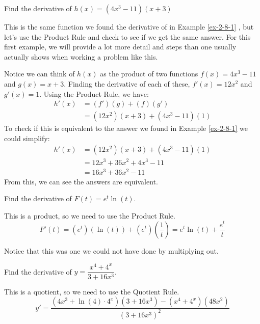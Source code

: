 \begin{example}
Find the derivative of $h(x)=(4x^3-11)(x+3)$

\begin{solution} This is the same function we found the derivative of in Example \ref{ex-2-8-1} , but let's use the Product Rule and check to see if we get the same answer. For this first example, we will provide a lot more detail and steps than one usually actually shows when working a problem like this.

Notice we can think of $h(x)$ as the product of two functions $f(x)=4x^3-11$ and $g(x)=x+3$. Finding the derivative of each of these,
$f'(x)=12x^2$ and $g'(x)=1$.
Using the Product Rule, we have: 
\begin{align*}
		h'(x) &= (f')(g)+(f)(g') \\
		 &= \left(12x^2\right)(x+3)+\left(4x^3-11\right)(1)
	\end{align*}
To check if this is equivalent to the answer we found in Example \ref{ex-2-8-1}  we could simplify:
\begin{align*}
		h'(x) &= \left(12x^2\right)(x+3)+\left(4x^3-11\right)(1) \\
		 &= 12x^3+36x^2+4x^3-11 \\
		 &= 16x^3+36x^2-11
	\end{align*}
From this, we can see the answers are equivalent.
\end{solution}\end{example}

\begin{example}
Find the derivative of $ F(t)=e^t\ln(t) $.

\begin{solution} This is a product, so we need to use the Product Rule. 
$$F'(t)=\left(e^t\right)\left(\ln(t)\right)+\left(e^t\right)\left(\dfrac{1}{t}\right)=e^t\ln(t)+\dfrac{e^t}{t}$$
\end{solution}\end{example}

Notice that this was one we could not have done by multiplying out.

\begin{example}
Find the derivative of $ y=\dfrac{x^4+4^x}{3+16x^3} $.

\begin{solution} This is a quotient, so we need to use the Quotient Rule.
$$y'=\dfrac{\left(4x^3+\ln(4)\cdot 4^x \right)\left(3+16x^3 \right)-\left(x^4+4^x \right)\left(48x^2 \right)}{\left(3+16x^3 \right)^2}$$
\end{solution}\end{example}

